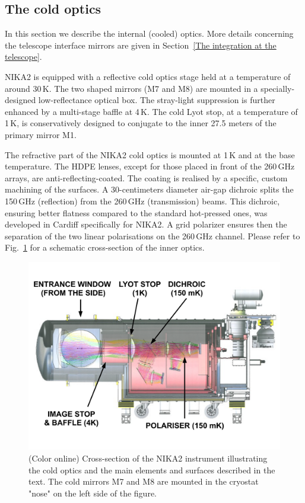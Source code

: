 \documentclass[]{aa} %
\begin{document}
 \subsection{The cold optics}

In this section we describe the internal (cooled) optics. More details concerning the telescope interface mirrors are given in Section~\ref{The integration at the telescope}.

NIKA2 is equipped with a reflective cold optics stage held at a temperature of around 30\,K. The two shaped mirrors (M7 and M8) are mounted in a specially-designed low-reflectance optical box. The stray-light suppression is further enhanced by a multi-stage baffle at 4\,K. The cold Lyot stop, at a temperature of 1\,K, is conservatively designed to conjugate to the inner 27.5 meters of the primary mirror M1.

The refractive part of the NIKA2 cold optics is mounted at 1\,K and at the base temperature. The HDPE lenses, except for those placed in front of the 260\,GHz arrays, are anti-reflecting-coated. The coating is realised by a specific, custom machining of the surfaces. A 30-centimeters diameter air-gap dichroic splits the 150\,GHz (reflection) from the 260\,GHz (transmission) beams. This dichroic, ensuring better flatness compared to the standard hot-pressed ones, was developed in Cardiff specifically for NIKA2. A grid polarizer ensures then the separation of the two linear polarisations on the 260\,GHz channel. Please refer to Fig.~\ref{Cryostat_optics} for a schematic cross-section of the inner optics.

\begin{figure}[h]
   \centering
   \includegraphics[width=.95\linewidth]{NIKA2_optics.pdf}
      \caption{(Color online) Cross-section of the NIKA2 instrument illustrating the cold optics and the main elements and surfaces described in the text. The cold mirrors M7 and M8 are mounted in the cryostat "nose" on the left side of the figure.}
         \label{Cryostat_optics}
\end{figure}
\end{document}

